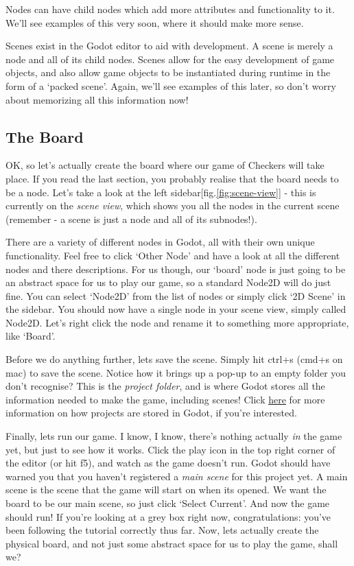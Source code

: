 \documentclass[14pt]{extarticle}
\newcommand{\prettyref}[2]{[{#1}.\ref{#2}]}
\begin{document}
Nodes can have child nodes which add more attributes and functionality to it. We'll see examples of this very soon, where it should make more sense.

Scenes exist in the Godot editor to aid with development. A scene is merely a node and all of its child nodes. Scenes allow for the easy development of game objects, and also allow game objects to be instantiated during runtime in the form of a `packed scene'. Again, we'll see examples of this later, so don't worry about memorizing all this information now!

\subsection*{The Board}
OK, so let's actually create the board where our game of Checkers will take place. If you read the last section, you probably realise that the board needs to be a node. Let's take a look at the left sidebar\prettyref{fig}{fig:scene-view} - this is currently on the \textit{scene view}, which shows you all the nodes in the current scene (remember - a scene is just a node and all of its subnodes!).


There are a variety of different nodes in Godot, all with their own unique functionality. Feel free to click `Other Node' and have a look at all the different nodes and there descriptions. For us though, our `board' node is just going to be an abstract space for us to play our game, so a standard Node2D will do just fine. You can select `Node2D' from the list of nodes or simply click `2D Scene' in the sidebar. You should now have a single node in your scene view, simply called Node2D. Let's right click the node and rename it to something more appropriate, like `Board'.

Before we do anything further, lets save the scene. Simply hit ctrl+s (cmd+s on mac) to save the scene. Notice how it brings up a pop-up to an empty folder you don't recognise? This is the \textit{project folder}, and is where Godot stores all the information needed to make the game, including scenes! Click \href{https://docs.godotengine.org/en/stable/tutorials/io/data_paths.html#}{\underline{here}} for more information on how projects are stored in Godot, if you're interested.

Finally, lets run our game. I know, I know, there's nothing actually \textit{in} the game yet, but just to see how it works. Click the play icon in the top right corner of the editor (or hit f5), and watch as the game doesn't run. Godot should have warned you that you haven't registered a \textit{main scene} for this project yet. A main scene is the scene that the game will start on when its opened. We want the board to be our main scene, so just click `Select Current'. And now the game should run! If you're looking at a grey box right now, congratulations: you've been following the tutorial correctly thus far. Now, lets actually create the physical board, and not just some abstract space for us to play the game, shall we?
\end{document}
